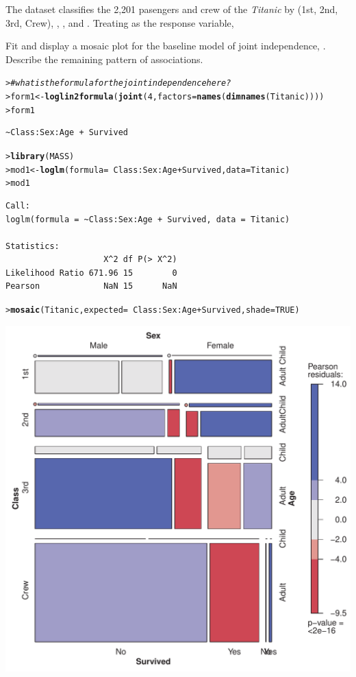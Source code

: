 \documentclass[10pt]{report}\usepackage[]{graphicx}\usepackage[]{color}
\makeatletter
\newcommand{\hlnum}[1]{\textcolor[rgb]{0.686,0.059,0.569}{#1}}%
\newcommand{\hlcom}[1]{\textcolor[rgb]{0.678,0.584,0.686}{\textit{#1}}}%
\newcommand{\hlopt}[1]{\textcolor[rgb]{0,0,0}{#1}}%
\newcommand{\hlstd}[1]{\textcolor[rgb]{0.345,0.345,0.345}{#1}}%
\newcommand{\hlkwb}[1]{\textcolor[rgb]{0.69,0.353,0.396}{#1}}%
\newcommand{\hlkwc}[1]{\textcolor[rgb]{0.333,0.667,0.333}{#1}}%
\newcommand{\hlkwd}[1]{\textcolor[rgb]{0.737,0.353,0.396}{\textbf{#1}}}%
\newenvironment{kframe}{%
 \def\at@end@of@kframe{}%
 \ifinner\ifhmode%
  \def\at@end@of@kframe{\end{minipage}}%
  \begin{minipage}{\columnwidth}%
 \fi\fi%
 \def\FrameCommand##1{\hskip\@totalleftmargin \hskip-\fboxsep
 \colorbox{shadecolor}{##1}\hskip-\fboxsep
     \hskip-\linewidth \hskip-\@totalleftmargin \hskip\columnwidth}%
 \MakeFramed {\advance\hsize-\width
   \@totalleftmargin\z@ \linewidth\hsize
   \@setminipage}}%
 {\par\unskip\endMakeFramed%
 \at@end@of@kframe}
\newenvironment{knitrout}{}{} %
\renewenvironment{knitrout}{\small\renewcommand{\baselinestretch}{.85}}{} %
\makeatother
\begin{document}
\begin{Exercises}
  \exercise\label{lab:mosaic-titanic} The dataset  classifies the 2,201 pasengers and crew of the \emph{Titanic}
  by  (1st, 2nd, 3rd, Crew), , , and . Treating  as the response variable,
    \begin{enumerate*}
      \item Fit and display a mosaic plot for the baseline model of joint independence, . 
      Describe the remaining pattern of associations.
      \begin{ans}
\begin{knitrout}\footnotesize
{}\color{fgcolor}\begin{kframe}
\begin{alltt}
\hlstd{> }\hlcom{# what is the formula for the joint independence here?}
\hlstd{> }\hlstd{form1} \hlkwb{<-} \hlkwd{loglin2formula}\hlstd{(}\hlkwd{joint}\hlstd{(}\hlnum{4}\hlstd{,} \hlkwc{factors}\hlstd{=}\hlkwd{names}\hlstd{(}\hlkwd{dimnames}\hlstd{(Titanic))))}
\hlstd{> }\hlstd{form1}
\end{alltt}
\begin{verbatim}
~Class:Sex:Age + Survived
\end{verbatim}
\begin{alltt}
\hlstd{> }\hlkwd{library}\hlstd{(MASS)}
\hlstd{> }\hlstd{mod1} \hlkwb{<-} \hlkwd{loglm}\hlstd{(}\hlkwc{formula}\hlstd{=}\hlopt{~}\hlstd{Class}\hlopt{:}\hlstd{Sex}\hlopt{:}\hlstd{Age} \hlopt{+} \hlstd{Survived,} \hlkwc{data}\hlstd{=Titanic)}
\hlstd{> }\hlstd{mod1}
\end{alltt}
\begin{verbatim}
Call:
loglm(formula = ~Class:Sex:Age + Survived, data = Titanic)

Statistics:
                    X^2 df P(> X^2)
Likelihood Ratio 671.96 15        0
Pearson             NaN 15      NaN
\end{verbatim}
\begin{alltt}
\hlstd{> }\hlkwd{mosaic}\hlstd{(Titanic,} \hlkwc{expected}\hlstd{=}\hlopt{~}\hlstd{Class}\hlopt{:}\hlstd{Sex}\hlopt{:}\hlstd{Age} \hlopt{+} \hlstd{Survived,} \hlkwc{shade}\hlstd{=}\hlnum{TRUE}\hlstd{)}
\end{alltt}
\end{kframe}

\centerline{\includegraphics[width=.6\textwidth]{soln/fig/ex5_12a-1} }




\end{knitrout}
\end{ans}
\end{enumerate*}
\end{Exercises}
\end{document}
